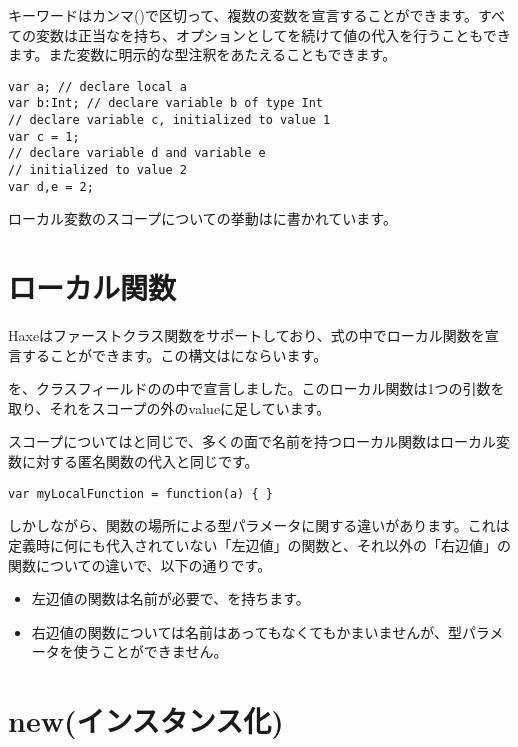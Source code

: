 キーワードはカンマ(\expr{,})で区切って、複数の変数を宣言することができます。すべての変数は正当なを持ち、オプションとして\expr{=}を続けて値の代入を行うこともできます。また変数に明示的な型注釈をあたえることもできます。

\begin{lstlisting}
var a; // declare local a
var b:Int; // declare variable b of type Int
// declare variable c, initialized to value 1
var c = 1;
// declare variable d and variable e
// initialized to value 2
var d,e = 2;
\end{lstlisting}

ローカル変数のスコープについての挙動はに書かれています。

\section{ローカル関数}
\label{expression-function}

Haxeはファーストクラス関数をサポートしており、式の中でローカル関数を宣言することができます。この構文はにならいます。


を、クラスフィールドのの中で宣言しました。このローカル関数は1つの引数を取り、それをスコープの外のvalueに足しています。

スコープについてはと同じで、多くの面で名前を持つローカル関数はローカル変数に対する匿名関数の代入と同じです。

\begin{lstlisting}
var myLocalFunction = function(a) { }
\end{lstlisting}

しかしながら、関数の場所による型パラメータに関する違いがあります。これは定義時に何にも代入されていない「左辺値」の関数と、それ以外の「右辺値」の関数についての違いで、以下の通りです。

\begin{itemize}
	\item 左辺値の関数は名前が必要で、を持ちます。
	\item 右辺値の関数については名前はあってもなくてもかまいませんが、型パラメータを使うことができません。
\end{itemize}

\section{new(インスタンス化)}
\label{expression-new}

